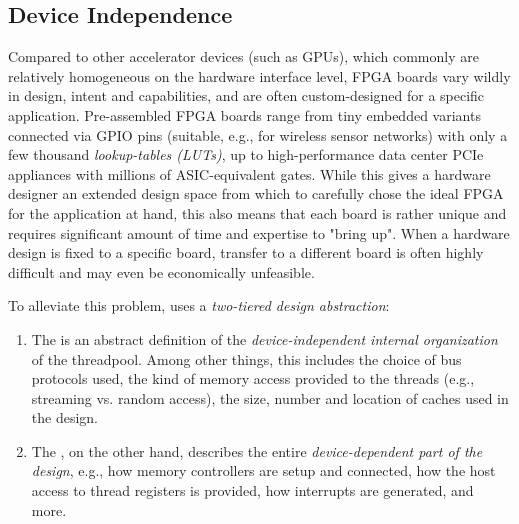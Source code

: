 \subsection*{Device Independence}\label{sec:device-independency}%
Compared to other accelerator devices (such as GPUs), which commonly are relatively homogeneous on the hardware interface level, FPGA boards vary wildly in design, intent and capabilities, and are often custom-designed for a specific application.
Pre-assembled FPGA boards range from tiny embedded variants connected via GPIO pins (suitable, e.g., for wireless sensor networks) with only a few thousand \emph{lookup-tables (LUTs)}, up to high-performance data center PCIe appliances with millions of ASIC-equivalent gates.
While this gives a hardware designer an extended design space from which to carefully chose the ideal FPGA for the application at hand, this also means that each board is rather unique and requires significant amount of time and expertise to "bring up".
When a hardware design is fixed to a specific board, transfer to a different board is often highly difficult and may even be economically unfeasible.

\medskip
To alleviate this problem, \tpc{} uses a \emph{two-tiered design abstraction}:

\begin{enumerate}
  \item The  is an abstract definition of the \emph{device-independent internal organization} of the threadpool. Among other things, this includes the choice of bus protocols used, the kind of memory access provided to the threads (e.g., streaming vs. random access), the size, number and location of caches used in the design. 
  \item The , on the other hand, describes the entire \emph{device-dependent part of the design}, e.g., how memory controllers are setup and connected, how the host access to thread registers is provided, how interrupts are generated, and more.
\end{enumerate}

